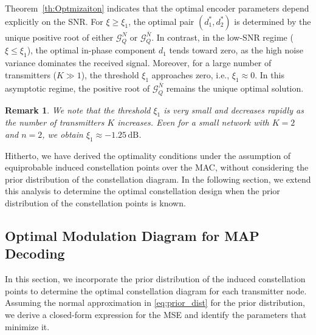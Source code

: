 \documentclass[journal,12pt,onecolumn,draftclsnofoot]{IEEEtran}
\newtheorem{remark}{Remark}
\theoremstyle{definition}
\begin{document}
Theorem~\ref{th:Optmizaiton} indicates that the optimal encoder parameters depend explicitly on the SNR.  For \(\xi \ge \xi_1\), the optimal pair \(({d}_1^*, {d}_2^*)\) is determined by the unique positive root of either \(\mathcal{G}_Q^N\) or \(\mathcal{G}_Q^{\bar{N}}\).  
In contrast, in the low-SNR regime (\(\xi \le \xi_1\)), the optimal in-phase component \(d_1\) tends toward zero, as the high noise variance dominates the received signal.   Moreover, for a large number of transmitters (\(K \gg 1\)), the threshold \(\xi_1\) approaches zero, i.e., \(\xi_1 \approx 0\).   In this asymptotic regime, the positive root of \(\mathcal{G}_Q^{\bar{N}}\) remains the unique optimal solution.  


\begin{remark}\label{rem:smallroot}
 We note that the threshold \(\xi_1\) is very small and decreases rapidly as the number of transmitters \(K\) increases. Even for a small network with \(K=2\) and \(n=2\), we obtain \(\xi_1 \approx -1.25\,\mathrm{dB}\).
\end{remark}

Hitherto, we have derived the optimality conditions under the assumption of equiprobable induced constellation points over the MAC, without considering the prior distribution of the constellation diagram. 
In the following section, we extend this analysis to determine the optimal constellation design when the prior distribution of the constellation points is known.



\subsection{Optimal Modulation Diagram for MAP Decoding}

In this section, we incorporate the prior distribution of the induced constellation points to determine the optimal constellation diagram for each transmitter node. Assuming the normal approximation in \eqref{eq:prior_dist} for the prior distribution, we derive a closed-form expression for the MSE and identify the parameters that minimize it.  
\end{document}
